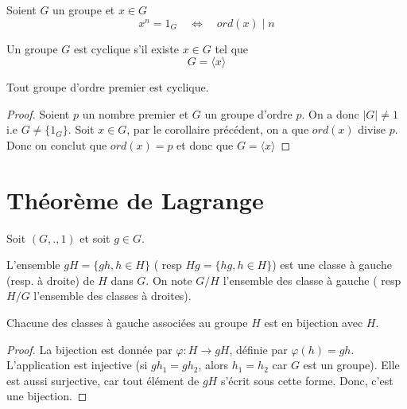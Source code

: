 \begin{proposition}
Soient $G$ un groupe et $x\in G$
\begin{equation*}
    x^n = 1_G \quad \Leftrightarrow \quad ord(x) \mid n 
\end{equation*}
\end{proposition}

\begin{definition}
    Un groupe $G$ est cyclique s'il existe $x\in G$ tel que
    \begin{equation*} 
        G = \langle x\rangle
    \end{equation*}
\end{definition}

\begin{lemme}
    Tout groupe d'ordre premier est cyclique.
\end{lemme}

\begin{proof}
    Soient $p$ un nombre premier et $G$ un groupe d'ordre $p$. On a donc $\left|G\right| \neq 1$ i.e $G \neq \{1_G\}$. Soit $x\in G$, par le corollaire précédent, on a que $ord(x)$ divise $p$. Donc on conclut que $ord(x) = p$ et donc que $G=\langle x\rangle$
\end{proof}

\section{Théorème de Lagrange}
Soit $(G,.,1) $ et soit $g\in G$.

\begin{definition}
    L'ensemble $gH=\{gh,h\in H\}$ ( resp $Hg = \{hg, h\in H\}$) est une classe à gauche (resp. à droite) de $H$ dans $G$. 
    On note $G/H$ l'ensemble des classe à gauche ( resp $H/G$ l'ensemble des classes à droites).
\end{definition}

\begin{lemme}
    Chacune des classes à gauche associées au groupe $H$ est en bijection avec $H$.
\end{lemme}

\begin{proof}
    La bijection est donnée par $\varphi : H \to gH$, définie par $\varphi(h) = g h$. L’application est injective (si $gh_1 = gh_2$, alors $h_1 = h_2$ car $G$ est un groupe). Elle est aussi surjective, car tout élément de $gH$ s’écrit sous cette forme. Donc, c’est une bijection.
\end{proof}

